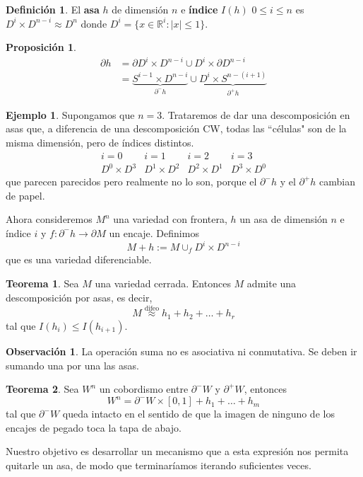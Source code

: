 \documentclass[spanish]{book}
\theoremstyle{definition}
\newtheorem*{defn}{Definición}
\newtheorem*{obs}{Observación}
\newtheorem*{teo}{Teorema}
\newtheorem*{prop}{Proposición}
\newtheorem*{ejem}{Ejemplo}
\newcommand{\R}{\mathbb{R}}
\begin{document}
\begin{defn}
	El \textbf{asa} $h$ de dimensión $n$ e \textbf{índice} $I(h)$ $0\leq i\leq n$ es $D^i\times D^{n-i}\approx D^n$ donde $D^i=\{x\in\R^i:|x|\leq 1\}$.
\end{defn}
\begin{prop}
	\begin{align*}
	\partial h&=\partial D^i\times D^{n-i}\cup D^i\times \partial D^{n-i}\\
	&=\underbrace{S^{i-1}\times D^{n-i}}_{\partial^-h}\cup\underbrace{ D^{i}\times S^{n-(i+1)}}_{\partial^+h}
	\end{align*}
\end{prop}
\begin{ejem}
	Supongamos que $n=3$. Trataremos de dar una descomposición en asas que, a diferencia de una descomposición CW, todas las ``células" son de la misma dimensión, pero de índices distintos.
	\[\begin{matrix}
		i=0&i=1&i=2&i=3\\
		D^0\times D^3&D^1\times D^2&D^2\times D^1&D^3\times D^0
	\end{matrix}\]
	que parecen parecidos pero realmente no lo son, porque el $\partial^-h$ y el $\partial^+h$ cambian de papel.
\end{ejem}
Ahora consideremos $M^n$ una variedad con frontera, $h$ un asa de dimensión $n$ e índice $i$ y $f:\partial^-h\to\partial M$ un encaje. Definimos
\[M+h:=M\cup_f D^i\times D^{n-i}\]
que es una variedad diferenciable.

\begin{teo}
	Sea $M$ una variedad cerrada. Entonces $M$ admite una descomposición por asas, es decir,
	\[M\overset{\text{difeo}}{\approx} h_1+h_2+\ldots+h_r\]
	tal que $I(h_i)\leq I(h_{i+1})$.
\end{teo}
\begin{obs}
	La operación suma no es asociativa ni conmutativa. Se deben ir sumando una por una las asas.
\end{obs}

\begin{teo}
	Sea $W^n$ un cobordismo entre $\partial^-W$ y $\partial^+W$, entonces
	\[W^n=\partial^-W\times [0,1]+h_1+\ldots+h_m\]
	tal que $\partial^-W$ queda intacto en el sentido de que la imagen de ninguno de los encajes de pegado toca la tapa de abajo.
\end{teo}
Nuestro objetivo es desarrollar un mecanismo que a esta expresión nos permita quitarle un asa, de modo que terminaríamos iterando suficientes veces.
\end{document}
